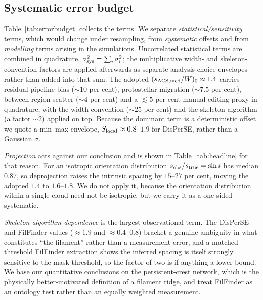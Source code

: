 \documentclass[usenatbib,twoside,twocolumn]{mnras}
\begin{document}
\subsection{Systematic error budget}
\label{sec:error_budget}

Table~\ref{tab:errorbudget} collects the terms. We separate \emph{statistical/sensitivity} terms, which would change under resampling, from \emph{systematic} offsets and from \emph{modelling} terms arising in the simulations. Uncorrelated statistical terms are combined in quadrature, $\sigma_{\rm sys}^2=\sum_i\sigma_i^2$; the multiplicative width- and skeleton-convention factors are applied afterwards as separate analysis-choice envelopes rather than added into that sum. The adopted $(s_{\rm ACS,med}/W)_0\approx1.4$ carries residual pipeline bias ($\sim10$ per cent), protostellar migration ($\sim7.5$ per cent), between-region scatter ($\sim4$ per cent) and a $\lesssim5$ per cent manual-editing proxy in quadrature, with the width convention ($\sim25$ per cent) and the skeleton algorithm (a factor $\sim2$) applied on top. Because the dominant term is a deterministic offset we quote a min--max envelope, $S_{\rm local}\approx0.8$--$1.9$ for DisPerSE, rather than a Gaussian $\sigma$.

\emph{Projection} acts against our conclusion and is shown in Table~\ref{tab:headline} for that reason. For an isotropic orientation distribution $s_{\rm obs}/s_{\rm true}=\sin i$ has median $0.87$, so deprojection raises the intrinsic spacing by $15$--$27$ per cent, moving the adopted $1.4$ to $1.6$--$1.8$. We do not apply it, because the orientation distribution within a single cloud need not be isotropic, but we carry it as a one-sided systematic.

\emph{Skeleton-algorithm dependence} is the largest observational term. The DisPerSE and FilFinder values ($\approx1.9$ and $\approx0.4$--$0.8$) bracket a genuine ambiguity in what constitutes ``the filament'' rather than a measurement error, and a matched-threshold FilFinder extraction shows the inferred spacing is itself strongly sensitive to the mask threshold, so the factor of two is if anything a lower bound. We base our quantitative conclusions on the persistent-crest network, which is the physically better-motivated definition of a filament ridge, and treat FilFinder as an ontology test rather than an equally weighted measurement.
\end{document}

